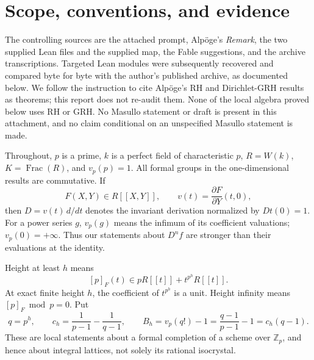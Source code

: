 \documentclass[11pt,a4paper]{article}
\theoremstyle{definition}\newtheorem{remark}[theorem]{Remark}
\newcommand{\Z}{\mathbb Z}\newcommand{\Q}{\mathbb Q}\newcommand{\F}{\mathbb F}
\newcommand{\vp}{v_p}\newcommand{\dR}{\mathrm{dR}}\newcommand{\crys}{\mathrm{crys}}
\begin{document}
\begin{abstract}
Grothendieck's boxed zero $p$-operation in cote 54 belongs to the vector kernel of a universal extension, not a supersingularity condition. Oda's theorem supplies the established de Rham/Dieudonn\'e comparison. Identity Frobenius lifts yield binomial structures under flatness; numerical polynomials have a divided-power associated graded, and Horel's theorem gives the precise integral homotopy statement.

\textbf{Status.} The local bounds and the stated algebraic corrections are proved and checked. The literal height-only substitution into the existing logarithm and alternating CM-type interfaces is refuted. A different construction producing a shorter global theta-lift chain remains open at an explicit construction-and-cost gate. That broader part remains under active investigation; no shorter proof is claimed. The final state will be set only when the stopping rule or completion ends the session.
\end{abstract}
\tableofcontents
\newpage

\section{Scope, conventions, and evidence}

The controlling sources are the attached prompt, Alp\"oge's \emph{Remark}, the two supplied Lean files and the supplied map, the Fable suggestions, and the archive transcriptions. Targeted Lean modules were subsequently recovered and compared byte for byte with the author's published archive, as documented below. We follow the instruction to cite Alp\"oge's RH and Dirichlet-GRH results as theorems; this report does not re-audit them. None of the local algebra proved below uses RH or GRH. No Masullo statement or draft is present in this attachment, and no claim conditional on an unspecified Masullo statement is made.

Throughout, $p$ is a prime, $k$ is a perfect field of characteristic $p$, $R=W(k)$, $K=\operatorname{Frac}(R)$, and $\vp(p)=1$. All formal groups in the one-dimensional results are commutative. If
\[
 F(X,Y)\in R[[X,Y]],\qquad v(t)=\frac{\partial F}{\partial Y}(t,0),
\]
then $D=v(t)\,d/dt$ denotes the invariant derivation normalized by $Dt(0)=1$. For a power series $g$, $\vp(g)$ means the infimum of its coefficient valuations; $\vp(0)=+\infty$. Thus our statements about $D^n f$ are stronger than their evaluations at the identity.

Height at least $h$ means
\begin{equation}\label{eq:height}
 [p]_F(t)\in pR[[t]]+t^{p^h}R[[t]].
\end{equation}
At exact finite height $h$, the coefficient of $t^{p^h}$ is a unit. Height infinity means $[p]_F\bmod p=0$. Put
\begin{equation}\label{eq:constants}
 q=p^h,\qquad c_h=\frac1{p-1}-\frac1{q-1},\qquad
 B_h=\vp(q!)-1=\frac{q-1}{p-1}-1=c_h(q-1).
\end{equation}
These are local statements about a formal completion of a scheme over $\Z_p$, and hence about integral lattices, not solely its rational isocrystal.
\end{document}
